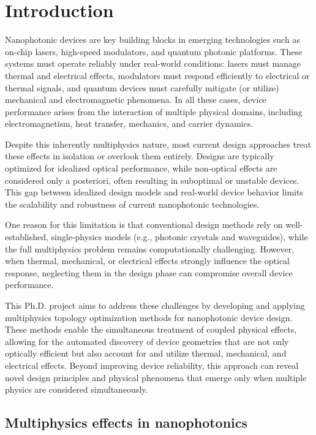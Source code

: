 \chapter{Introduction}
Nanophotonic devices are key building blocks in emerging technologies such as on-chip lasers, high-speed modulators, and quantum photonic platforms. 
These systems must operate reliably under real-world conditions: lasers must manage thermal and electrical effects, modulators must respond efficiently 
to electrical or thermal signals, and quantum devices must carefully mitigate (or utilize) mechanical and electromagnetic phenomena. In all these cases, device 
performance arises from the interaction of multiple physical domains, including electromagnetism, heat transfer, mechanics, and carrier dynamics.

Despite this inherently multiphysics nature, most current design approaches treat these effects in isolation or overlook them entirely. Designs are typically optimized 
for idealized optical performance, while non-optical effects are considered only a posteriori,
often resulting in suboptimal or unstable devices. This gap between idealized design models and real-world device behavior limits the scalability and robustness of current nanophotonic technologies.

One reason for this limitation is that conventional design methods rely on well-established, single-physics models (e.g., photonic crystals and waveguides), while the full multiphysics problem remains computationally challenging.
However, when thermal, mechanical, or electrical effects strongly influence the optical response, neglecting them in the design phase can compromise overall device performance.

This Ph.D. project aims to address these challenges by developing and applying multiphysics topology optimization methods for nanophotonic device design. These methods enable the simultaneous treatment of coupled physical effects, 
allowing for the automated discovery of device geometries that are not only optically efficient but also account for and utilize thermal, mechanical, and electrical effects. Beyond improving device reliability, this approach can reveal 
novel design principles and physical phenomena that emerge only when multiple physics are considered simultaneously.

\section{Multiphysics effects in nanophotonics}\label{intro:multi}

